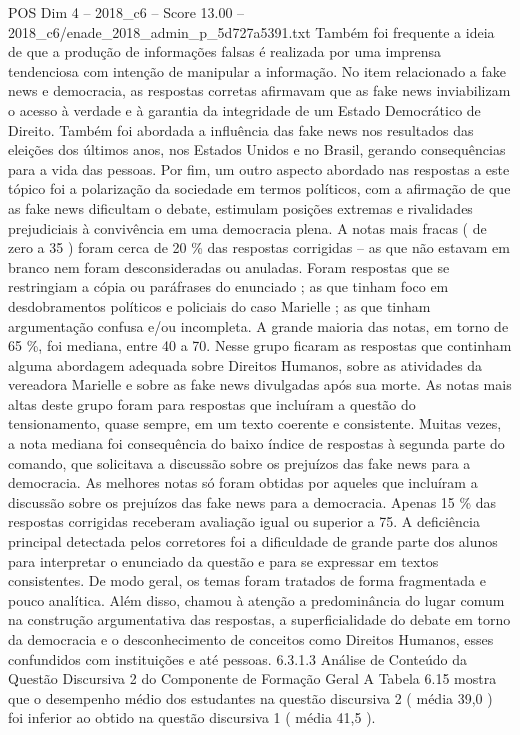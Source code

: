 \begin{textsample}{POS Dim 4 – 2018\_c6 – Score 13.00 – 2018\_c6/enade\_2018\_admin\_p\_5d727a5391.txt}
Também foi frequente a ideia de que a produção de informações falsas é realizada por uma imprensa tendenciosa com intenção de manipular a informação.
No item relacionado a fake news e democracia, as respostas corretas afirmavam que as fake news inviabilizam o acesso à verdade e à garantia da integridade de um Estado Democrático de Direito.
Também foi abordada a influência das fake news nos resultados das eleições dos últimos anos, nos Estados Unidos e no Brasil, gerando consequências para a vida das pessoas.
Por fim, um outro aspecto abordado nas respostas a este tópico foi a polarização da sociedade em termos políticos, com a afirmação de que as fake news dificultam o debate, estimulam posições extremas e rivalidades prejudiciais à convivência em uma democracia plena.
A notas mais fracas ( de zero a 35 ) foram cerca de 20 \% das respostas corrigidas – as que não estavam em branco nem foram desconsideradas ou anuladas.
Foram respostas que se restringiam a cópia ou paráfrases do enunciado ; as que tinham foco em desdobramentos políticos e policiais do caso Marielle ; as que tinham argumentação confusa e/ou incompleta.
A grande maioria das notas, em torno de 65 \%, foi mediana, entre 40 a 70.
Nesse grupo ficaram as respostas que continham alguma abordagem adequada sobre Direitos Humanos, sobre as atividades da vereadora Marielle e sobre as fake news divulgadas após sua morte.
As notas mais altas deste grupo foram para respostas que incluíram a questão do tensionamento, quase sempre, em um texto coerente e consistente.
Muitas vezes, a nota mediana foi consequência do baixo índice de respostas à segunda parte do comando, que solicitava a discussão sobre os prejuízos das fake news para a democracia.
As melhores notas só foram obtidas por aqueles que incluíram a discussão sobre os prejuízos das fake news para a democracia.
Apenas 15 \% das respostas corrigidas receberam avaliação igual ou superior a 75.
A deficiência principal detectada pelos corretores foi a dificuldade de grande parte dos alunos para interpretar o enunciado da questão e para se expressar em textos consistentes.
De modo geral, os temas foram tratados de forma fragmentada e pouco analítica.
Além disso, chamou à atenção a predominância do lugar comum na construção argumentativa das respostas, a superficialidade do debate em torno da democracia e o desconhecimento de conceitos como Direitos Humanos, esses confundidos com instituições e até pessoas. 6.3.1.3 Análise de Conteúdo da Questão Discursiva 2 do Componente de Formação Geral A Tabela 6.15 mostra que o desempenho médio dos estudantes na questão discursiva 2 ( média 39,0 ) foi inferior ao obtido na questão discursiva 1 ( média 41,5 ).

\end{textsample}
